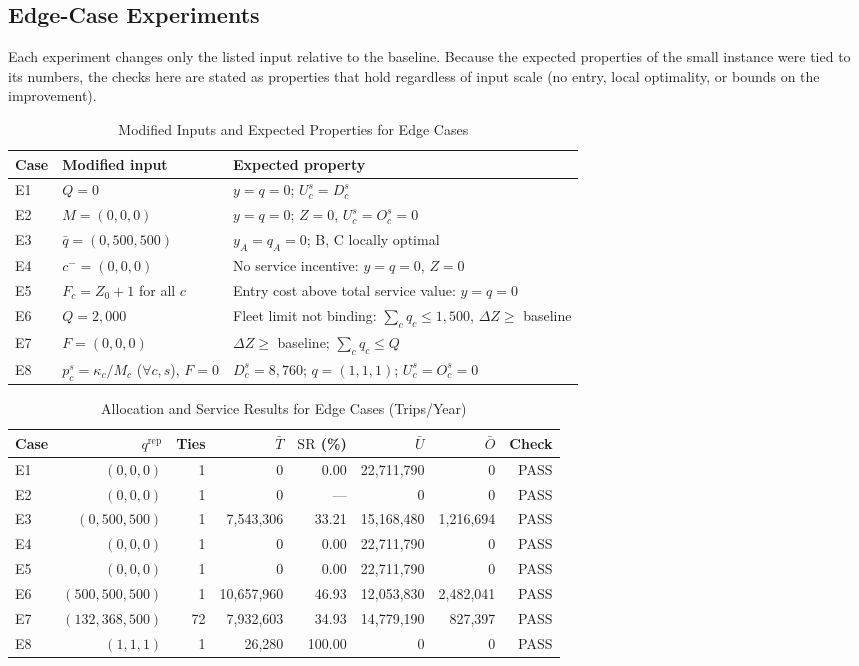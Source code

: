 \documentclass[10pt,a4paper]{article}
\begin{document}
\subsection{Edge-Case Experiments}
Each experiment changes only the listed input relative to the baseline. Because the expected properties of the small instance were tied to its numbers, the checks here are stated as properties that hold regardless of input scale (no entry, local optimality, or bounds on the improvement).
\begin{table}[H]
\centering\small
\caption{Modified Inputs and Expected Properties for Edge Cases}\label{tab:an-edge-design}
\begin{tabular}{lP{.36\linewidth}P{.50\linewidth}}
\toprule
Case & Modified input & Expected property\\\midrule
E1 & $Q=0$ & $y=q=0$; $U_c^s=D_c^s$\\
E2 & $M=(0,0,0)$ & $y=q=0$; $Z=0$, $U_c^s=O_c^s=0$\\
E3 & $\bar q=(0,500,500)$ & $y_A=q_A=0$; B, C locally optimal\\
E4 & $c^-=(0,0,0)$ & No service incentive: $y=q=0$, $Z=0$\\
E5 & $F_c=Z_0+1$ for all $c$ & Entry cost above total service value: $y=q=0$\\
E6 & $Q=2{,}000$ & Fleet limit not binding: $\sum_cq_c\le1{,}500$, $\Delta Z\ge$ baseline\\
E7 & $F=(0,0,0)$ & $\Delta Z\ge$ baseline; $\sum_cq_c\le Q$\\
E8 & $p_c^s=\kappa_c/M_c$ ($\forall c,s$), $F=0$ & $D_c^s=8{,}760$; $q=(1,1,1)$; $U_c^s=O_c^s=0$\\
\bottomrule
\end{tabular}
\end{table}
\begin{table}[H]
\centering\small
\caption{Allocation and Service Results for Edge Cases (Trips/Year)}\label{tab:an-edge-service}
\begin{tabular}{lrrrrrrr}
\toprule
Case & $q^{\mathrm{rep}}$ & Ties & $\bar T$ & $\mathrm{SR}$ (\%) & $\bar U$ & $\bar O$ & Check\\\midrule
E1 & $(0,0,0)$ & 1 & 0 & 0.00 & 22,711,790 & 0 & PASS\\
E2 & $(0,0,0)$ & 1 & 0 & --- & 0 & 0 & PASS\\
E3 & $(0,500,500)$ & 1 & 7,543,306 & 33.21 & 15,168,480 & 1,216,694 & PASS\\
E4 & $(0,0,0)$ & 1 & 0 & 0.00 & 22,711,790 & 0 & PASS\\
E5 & $(0,0,0)$ & 1 & 0 & 0.00 & 22,711,790 & 0 & PASS\\
E6 & $(500,500,500)$ & 1 & 10,657,960 & 46.93 & 12,053,830 & 2,482,041 & PASS\\
E7 & $(132,368,500)$ & 72 & 7,932,603 & 34.93 & 14,779,190 & 827,397 & PASS\\
E8 & $(1,1,1)$ & 1 & 26,280 & 100.00 & 0 & 0 & PASS\\
\bottomrule
\end{tabular}
\end{table}
\end{document}

